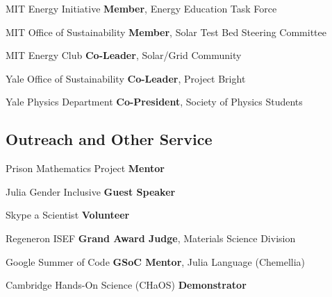 {MIT Energy Initiative}
{\textbf{Member}, Energy Education Task Force}
{}

{MIT Office of Sustainability}
{\textbf{Member}, Solar Test Bed Steering Committee}
{}

{MIT Energy Club}
{\textbf{Co-Leader}, Solar/Grid Community}
{}

{Yale Office of Sustainability}
{\textbf{Co-Leader}, Project Bright}
{}

{Yale Physics Department}
{\textbf{Co-President}, Society of Physics Students}
{}

\vspace{-3mm}
\subsection{Outreach and Other Service}
\vspace{-1mm}
{Prison Mathematics Project}
{\textbf{Mentor}}
{}

{Julia Gender Inclusive}
{\textbf{Guest Speaker}}
{}

{Skype a Scientist}
{\textbf{Volunteer}}
{}

{Regeneron ISEF}
{\textbf{Grand Award Judge}, Materials Science Division}
{}

{Google Summer of Code}
{\textbf{GSoC Mentor}, Julia Language (Chemellia)}
{}

{Cambridge Hands-On Science (CHaOS)}
{\textbf{Demonstrator}}
{}
